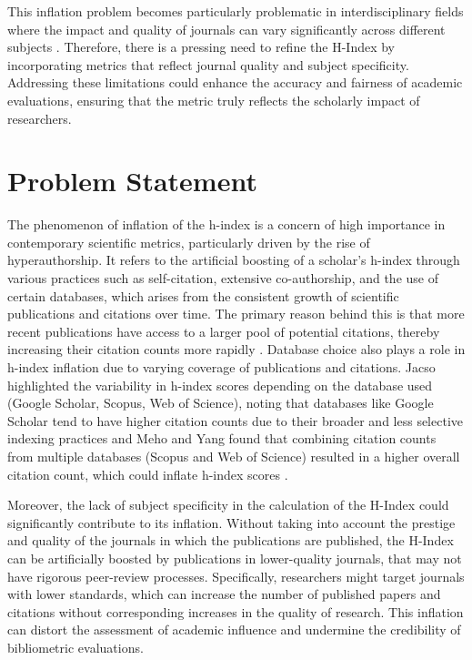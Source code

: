 This inflation problem becomes particularly problematic in interdisciplinary
fields where the impact and quality of journals can vary significantly across
different subjects \cite{hirsch2005index,waltman2012inconsistency}. Therefore,
there is a pressing need to refine the H-Index by incorporating metrics that
reflect journal quality and subject specificity. Addressing these limitations
could enhance the accuracy and fairness of academic evaluations, ensuring that
the metric truly reflects the scholarly impact of researchers.

\section{Problem Statement}
The phenomenon of inflation of the h-index is a concern of high importance in
contemporary scientific metrics, particularly driven by the rise of
hyperauthorship. It refers to the artificial boosting of a scholar's h-index
through various practices such as self-citation, extensive co-authorship, and
the use of certain databases, which arises from the consistent growth of
scientific publications and citations over time. The primary reason behind this
is that more recent publications have access to a larger pool of potential
citations, thereby increasing their citation counts more rapidly
\cite{norris2010h, koltun2021h, bi2023four}. Database choice also plays a role
in h-index inflation due to varying coverage of publications and citations.
Jacso highlighted the variability in h-index scores depending on the database
used (Google Scholar, Scopus, Web of Science), noting that databases like
Google Scholar tend to have higher citation counts due to their broader and
less selective indexing practices and Meho and Yang found that combining
citation counts from multiple databases (Scopus and Web of Science) resulted in
a higher overall citation count, which could inflate h-index scores
\cite{norris2010h}.

Moreover, the lack of subject specificity in the calculation of the H-Index
could significantly contribute to its inflation. Without taking into account
the prestige and quality of the journals in which the publications are
published, the H-Index can be artificially boosted by publications in
lower-quality journals, that may not have rigorous peer-review processes.
Specifically, researchers might target journals with lower standards, which can
increase the number of published papers and citations without corresponding
increases in the quality of research. This inflation can distort the assessment
of academic influence and undermine the credibility of bibliometric
evaluations.

